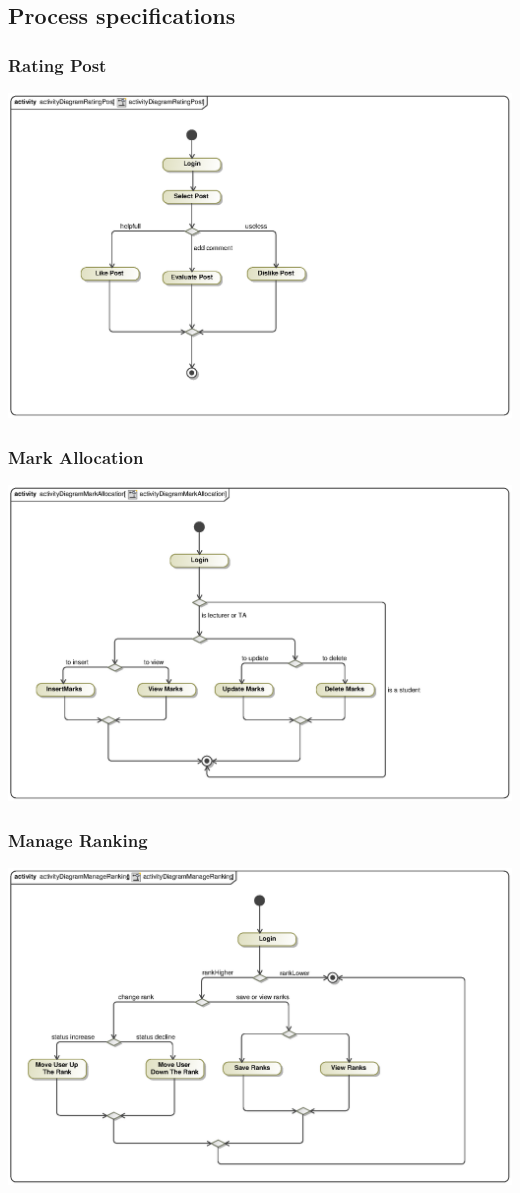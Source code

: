 \documentclass[hidelinks, 12pt, oneside]{article}
\begin{document}
\subsection{Process specifications}
\subsubsection{Rating Post}
\includegraphics[scale=.9]{Kgomotso/graphics/activityDiagramRatingPost.eps}\\

\subsubsection{Mark Allocation}
\includegraphics[scale=.9]{Kgomotso/graphics/activityDiagramMarkAllocation.eps}\\

\subsubsection{Manage Ranking}
\includegraphics[scale=.9]{Kgomotso/graphics/activityDiagramManageRanking.eps}\\
\end{document}
